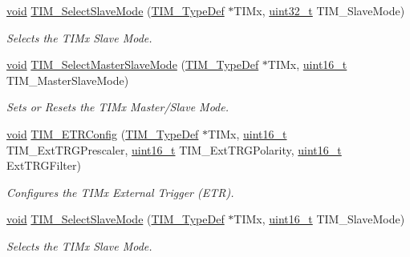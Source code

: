 \begin{DoxyCompactItemize}
\hyperlink{group___n_a_m_e_ga18028b8badbf1ea7e704ccac3c488e82}{void} \hyperlink{group___t_i_m___group7_gab1fb559c091f3ed0ff73239a25f8e21f}{T\-I\-M\-\_\-\-Select\-Slave\-Mode} (\hyperlink{struct_t_i_m___type_def}{T\-I\-M\-\_\-\-Type\-Def} $\ast$T\-I\-Mx, \hyperlink{stdint_8h_a435d1572bf3f880d55459d9805097f62}{uint32\-\_\-t} T\-I\-M\-\_\-\-Slave\-Mode)
\begin{DoxyCompactList}\small\item\em Selects the T\-I\-Mx Slave Mode. \end{DoxyCompactList}\item 
\hyperlink{group___n_a_m_e_ga18028b8badbf1ea7e704ccac3c488e82}{void} \hyperlink{group___t_i_m___group7_ga4dcc3d11b670c381d0ff9cb7e9fd01e2}{T\-I\-M\-\_\-\-Select\-Master\-Slave\-Mode} (\hyperlink{struct_t_i_m___type_def}{T\-I\-M\-\_\-\-Type\-Def} $\ast$T\-I\-Mx, \hyperlink{stdint_8h_a273cf69d639a59973b6019625df33e30}{uint16\-\_\-t} T\-I\-M\-\_\-\-Master\-Slave\-Mode)
\begin{DoxyCompactList}\small\item\em Sets or Resets the T\-I\-Mx Master/\-Slave Mode. \end{DoxyCompactList}\item 
\hyperlink{group___n_a_m_e_ga18028b8badbf1ea7e704ccac3c488e82}{void} \hyperlink{group___t_i_m___group7_ga8bdde400b7a30f3e747fe8e4962c0abe}{T\-I\-M\-\_\-\-E\-T\-R\-Config} (\hyperlink{struct_t_i_m___type_def}{T\-I\-M\-\_\-\-Type\-Def} $\ast$T\-I\-Mx, \hyperlink{stdint_8h_a273cf69d639a59973b6019625df33e30}{uint16\-\_\-t} T\-I\-M\-\_\-\-Ext\-T\-R\-G\-Prescaler, \hyperlink{stdint_8h_a273cf69d639a59973b6019625df33e30}{uint16\-\_\-t} T\-I\-M\-\_\-\-Ext\-T\-R\-G\-Polarity, \hyperlink{stdint_8h_a273cf69d639a59973b6019625df33e30}{uint16\-\_\-t} Ext\-T\-R\-G\-Filter)
\begin{DoxyCompactList}\small\item\em Configures the T\-I\-Mx External Trigger (E\-T\-R). \end{DoxyCompactList}\item 
\hyperlink{group___n_a_m_e_ga18028b8badbf1ea7e704ccac3c488e82}{void} \hyperlink{group___t_i_m___group7_ga2f19ce1d90990691cf037e419ba08003}{T\-I\-M\-\_\-\-Select\-Slave\-Mode} (\hyperlink{struct_t_i_m___type_def}{T\-I\-M\-\_\-\-Type\-Def} $\ast$T\-I\-Mx, \hyperlink{stdint_8h_a273cf69d639a59973b6019625df33e30}{uint16\-\_\-t} T\-I\-M\-\_\-\-Slave\-Mode)
\begin{DoxyCompactList}\small\item\em Selects the T\-I\-Mx Slave Mode. \end{DoxyCompactList}\end{DoxyCompactItemize}


